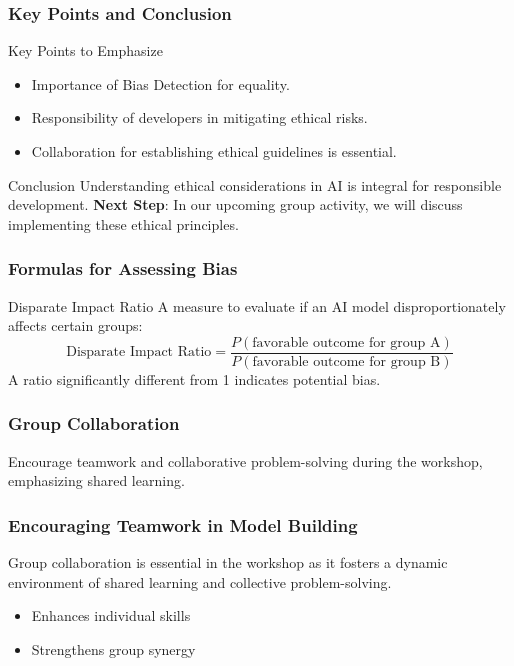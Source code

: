 \documentclass{beamer}
\begin{document}
\begin{frame}[fragile]
    \frametitle{Key Points and Conclusion}
    \begin{block}{Key Points to Emphasize}
        \begin{itemize}
            \item Importance of Bias Detection for equality.
            \item Responsibility of developers in mitigating ethical risks.
            \item Collaboration for establishing ethical guidelines is essential.
        \end{itemize}
    \end{block}
    
    \begin{block}{Conclusion}
        Understanding ethical considerations in AI is integral for responsible development.
        \textbf{Next Step}: In our upcoming group activity, we will discuss implementing these ethical principles.
    \end{block}
\end{frame}

\begin{frame}[fragile]
    \frametitle{Formulas for Assessing Bias}
    \begin{block}{Disparate Impact Ratio}
        A measure to evaluate if an AI model disproportionately affects certain groups:
        \begin{equation}
            \text{Disparate Impact Ratio} = \frac{P(\text{favorable outcome for group A})}{P(\text{favorable outcome for group B})}
        \end{equation}
        A ratio significantly different from 1 indicates potential bias.
    \end{block}
\end{frame}

\begin{frame}[fragile]
    \frametitle{Group Collaboration}
    Encourage teamwork and collaborative problem-solving during the workshop, emphasizing shared learning.
\end{frame}

\begin{frame}[fragile]
    \frametitle{Encouraging Teamwork in Model Building}
    Group collaboration is essential in the workshop as it fosters a dynamic environment of shared learning and collective problem-solving. 
    \begin{itemize}
        \item Enhances individual skills 
        \item Strengthens group synergy
    \end{itemize}
\end{frame}
\end{document}

